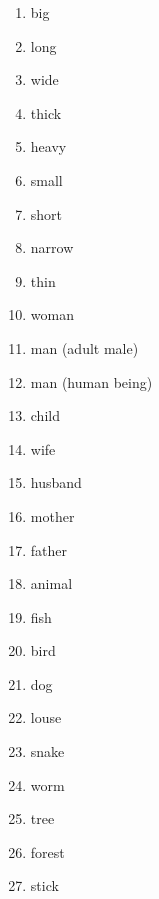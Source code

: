 \begin{multicols}{2}
\begin{enumerate}
\item   big 

\item   long 

\item   wide 

\item   thick 

\item   heavy 

\item   small 

\item   short 

\item   narrow 

\item   thin 

\item   woman 

\item   man (adult male) 

\item   man (human being) 

\item   child 

\item   wife 

\item   husband 

\item   mother 

\item   father 

\item   animal 

\item   fish 

\item   bird 

\item   dog 

\item   louse 

\item   snake 

\item   worm 

\item   tree 

\item   forest 

\item   stick 


\end{enumerate}
\end{multicols}
